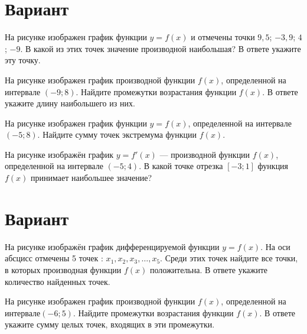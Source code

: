 \newpage\section{Вариант}\begin{taskBN}{1}
На рисунке изображен график функции $y=f(x)$ и отмечены точки $9,5$; $-3,9$; $4$; $-9$. В какой из этих точек значение производной наибольшая? В ответе укажите эту точку. 
\end{taskBN}

\begin{taskBN}{2}
На рисунке изображен график производной функции $f(x)$, определенной на интервале $(-9;8)$. Найдите промежутки возрастания функции $f(x)$. В ответе укажите длину наибольшего из них.
\end{taskBN}

\begin{taskBN}{3}
На рисунке изображен график функции $y=f(x)$, определенной на интервале $(-5;8)$. Найдите сумму точек экстремума функции $f(x)$.
\end{taskBN}

\begin{taskBN}{4}
На рисунке изображён график $y=f'(x)$ — производной функции $f(x)$, определенной на интервале $(-5;4)$. В какой точке отрезка $[-3; 1]$ функция $f(x)$ принимает наибольшее значение?
\end{taskBN}

\newpage\section{Вариант}\begin{taskBN}{1}
На рисунке изображён график дифференцируемой функции $y=f(x)$. На оси абсцисс отмечены 5 точек : $x_1, x_2, x_3, \dots, x_5$. Среди этих точек найдите все точки, в которых производная функции $f(x)$ положительна. В ответе укажите количество найденных точек.
\end{taskBN}

\begin{taskBN}{2}
На рисунке изображен график производной функции $f(x)$, определенной на интервале$(-6; 5)$. Найдите промежутки возрастания функции $f(x)$. В ответе укажите сумму целых точек, входящих в эти промежутки.
\end{taskBN}

